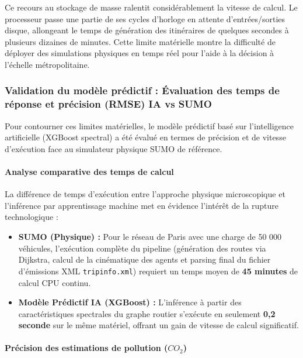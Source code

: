 \documentclass[10pt, a4paper]{article}
\providecommand{\tightlist}{}
\begin{document}
Ce recours au stockage de masse ralentit considérablement la vitesse de
calcul. Le processeur passe une partie de ses cycles d'horloge en
attente d'entrées/sorties disque, allongeant le temps de génération des
itinéraires de quelques secondes à plusieurs dizaines de minutes. Cette
limite matérielle montre la difficulté de déployer des simulations
physiques en temps réel pour l'aide à la décision à l'échelle
métropolitaine.

\subsubsection{Validation du modèle prédictif : Évaluation des temps de
réponse et précision (RMSE) IA vs
SUMO}\label{validation-du-moduxe8le-pruxe9dictif-uxe9valuation-des-temps-de-ruxe9ponse-et-pruxe9cision-rmse-ia-vs-sumo}

Pour contourner ces limites matérielles, le modèle prédictif basé sur
l'intelligence artificielle (XGBoost spectral) a été évalué en termes de
précision et de vitesse d'exécution face au simulateur physique SUMO de
référence.

\paragraph{Analyse comparative des temps de
calcul}\label{analyse-comparative-des-temps-de-calcul}

La différence de temps d'exécution entre l'approche physique
microscopique et l'inférence par apprentissage machine met en évidence
l'intérêt de la rupture technologique :

\begin{itemize}
\tightlist
\item
  \textbf{SUMO (Physique) :} Pour le réseau de Paris avec une charge de
  50 000 véhicules, l'exécution complète du pipeline (génération des
  routes via Dijkstra, calcul de la cinématique des agents et parsing
  final du fichier d'émissions XML \texttt{tripinfo.xml}) requiert un
  temps moyen de \textbf{45 minutes} de calcul CPU continu.
\item
  \textbf{Modèle Prédictif IA (XGBoost) :} L'inférence à partir des
  caractéristiques spectrales du graphe routier s'exécute en seulement
  \textbf{0,2 seconde} sur le même matériel, offrant un gain de vitesse
  de calcul significatif.
\end{itemize}

\paragraph{\texorpdfstring{Précision des estimations de pollution
(\(CO_2\))}{Précision des estimations de pollution (CO\_2)}}\label{pruxe9cision-des-estimations-de-pollution-co_2}
\end{document}
